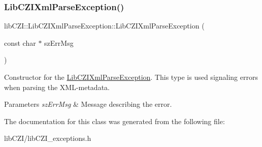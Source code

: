 \subsubsection{\texorpdfstring{Lib\+C\+Z\+I\+Xml\+Parse\+Exception()}{LibCZIXmlParseException()}}
{\footnotesize\ttfamily lib\+C\+Z\+I\+::\+Lib\+C\+Z\+I\+Xml\+Parse\+Exception\+::\+Lib\+C\+Z\+I\+Xml\+Parse\+Exception (\begin{DoxyParamCaption}\item[{const char $\ast$}]{sz\+Err\+Msg }\end{DoxyParamCaption})\hspace{0.3cm}{\ttfamily [inline]}}

Constructor for the \hyperlink{classlib_c_z_i_1_1_lib_c_z_i_xml_parse_exception}{Lib\+C\+Z\+I\+Xml\+Parse\+Exception}. This type is used signaling errors when parsing the X\+M\+L-\/metadata. 
\begin{DoxyParams}{Parameters}
{\em sz\+Err\+Msg} & Message describing the error. \\
\hline
\end{DoxyParams}


The documentation for this class was generated from the following file\+:\begin{DoxyCompactItemize}
\item 
lib\+C\+Z\+I/lib\+C\+Z\+I\+\_\+exceptions.\+h\end{DoxyCompactItemize}
